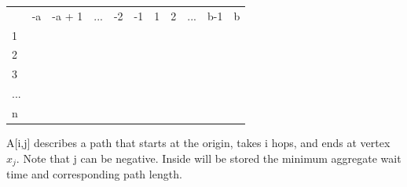 \documentclass[a4paper]{article}
\begin{document}
\begin{table}[htb]
\centering
\begin{tabular}{lllllllllll}
                         & -a                    & -a + 1                & ...                   & -2                    & -1                    & 1                     & 2                     & ...                   & b-1                   & b                     \\ \cline{2-11} 
\multicolumn{1}{l|}{1}   & \multicolumn{1}{l|}{} & \multicolumn{1}{l|}{} & \multicolumn{1}{l|}{} & \multicolumn{1}{l|}{} & \multicolumn{1}{l|}{} & \multicolumn{1}{l|}{} & \multicolumn{1}{l|}{} & \multicolumn{1}{l|}{} & \multicolumn{1}{l|}{} & \multicolumn{1}{l|}{} \\ \cline{2-11} 
\multicolumn{1}{l|}{2}   & \multicolumn{1}{l|}{} & \multicolumn{1}{l|}{} & \multicolumn{1}{l|}{} & \multicolumn{1}{l|}{} & \multicolumn{1}{l|}{} & \multicolumn{1}{l|}{} & \multicolumn{1}{l|}{} & \multicolumn{1}{l|}{} & \multicolumn{1}{l|}{} & \multicolumn{1}{l|}{} \\ \cline{2-11} 
\multicolumn{1}{l|}{3}   & \multicolumn{1}{l|}{} & \multicolumn{1}{l|}{} & \multicolumn{1}{l|}{} & \multicolumn{1}{l|}{} & \multicolumn{1}{l|}{} & \multicolumn{1}{l|}{} & \multicolumn{1}{l|}{} & \multicolumn{1}{l|}{} & \multicolumn{1}{l|}{} & \multicolumn{1}{l|}{} \\ \cline{2-11} 
\multicolumn{1}{l|}{...} & \multicolumn{1}{l|}{} & \multicolumn{1}{l|}{} & \multicolumn{1}{l|}{} & \multicolumn{1}{l|}{} & \multicolumn{1}{l|}{} & \multicolumn{1}{l|}{} & \multicolumn{1}{l|}{} & \multicolumn{1}{l|}{} & \multicolumn{1}{l|}{} & \multicolumn{1}{l|}{} \\ \cline{2-11} 
\multicolumn{1}{l|}{n}   & \multicolumn{1}{l|}{} & \multicolumn{1}{l|}{} & \multicolumn{1}{l|}{} & \multicolumn{1}{l|}{} & \multicolumn{1}{l|}{} & \multicolumn{1}{l|}{} & \multicolumn{1}{l|}{} & \multicolumn{1}{l|}{} & \multicolumn{1}{l|}{} & \multicolumn{1}{l|}{} \\ \cline{2-11} 
\end{tabular}
\end{table}

A[i,j] describes a path that starts at the origin,  takes i hops, and ends at vertex $x_j$. Note that j can be negative. Inside will be stored the minimum aggregate wait time and corresponding path length.
\end{document}
